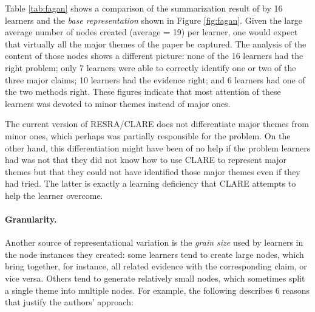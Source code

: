 Table \ref{tab:fagan} shows a comparison of the summarization result of
\cite{Fagan76} by 16 learners and the {\it base representation\/} shown in
Figure \ref{fig:fagan}. Given the large average number of nodes created
(average = 19) per learner, one would expect that virtually all the major
themes of the paper be captured. The analysis of the content of those nodes
shows a different picture: none of the 16 learners had the right problem;
only 7 learners were able to correctly identify one or two of the three
major claims; 10 learners had the evidence right; and 6 learners had one of
the two methods right. These figures indicate that most attention of these
learners was devoted to minor themes instead of major ones.

The current version of RESRA/CLARE does not differentiate major themes from
minor ones, which perhaps was partially responsible for the problem. On the
other hand, this differentiation might have been of no help if the problem
learners had was not that they did not know how to use CLARE to represent
major themes but that they could not have identified those major themes
even if they had tried. The latter is exactly a learning deficiency that
CLARE attempts to help the learner overcome.

\paragraph{Granularity.}

Another source of representational variation is the {\it grain size\/} used
by learners in the node instances they created: some learners tend to
create large nodes, which bring together, for instance, all related
evidence with the corresponding claim, or vice versa. Others tend to
generate relatively small nodes, which sometimes split a single theme into
multiple nodes. For example, the following  describes 6
reasons that justify the authors' approach:

